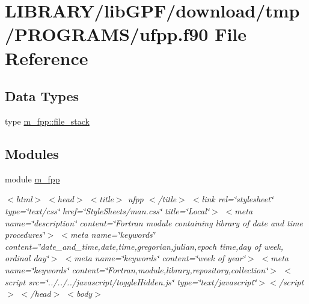 \hypertarget{ufpp_8f90}{}\section{L\+I\+B\+R\+A\+R\+Y/lib\+G\+P\+F/download/tmp/\+P\+R\+O\+G\+R\+A\+M\+S/ufpp.f90 File Reference}
\label{ufpp_8f90}
\subsection*{Data Types}
\begin{DoxyCompactItemize}
\item 
type \hyperlink{structm__fpp_1_1file__stack}{m\+\_\+fpp\+::file\+\_\+stack}
\end{DoxyCompactItemize}
\subsection*{Modules}
\begin{DoxyCompactItemize}
\item 
module \hyperlink{namespacem__fpp}{m\+\_\+fpp}
\begin{DoxyCompactList}\small\item\em $<$html$>$ $<$head$>$ $<$title$>$ ufpp $<$/title$>$ $<$link rel=\char`\"{}stylesheet\char`\"{} type=\char`\"{}text/css\char`\"{} href=\char`\"{}\+Style\+Sheets/man.\+css\char`\"{} title=\char`\"{}\+Local\char`\"{}$>$ $<$meta name=\char`\"{}description\char`\"{} content=\char`\"{}\+Fortran module containing library of date and time procedures\char`\"{}$>$ $<$meta name=\char`\"{}keywords\char`\"{} content=\char`\"{}date\+\_\+and\+\_\+time,date,time,gregorian,julian,epoch time,day of week, ordinal day\char`\"{}$>$ $<$meta name=\char`\"{}keywords\char`\"{} content=\char`\"{}week of year\char`\"{}$>$ $<$meta name=\char`\"{}keywords\char`\"{} content=\char`\"{}\+Fortran,module,library,repository,collection\char`\"{}$>$ $<$script src=\char`\"{}../../../javascript/toggle\+Hidden.\+js\char`\"{} type=\char`\"{}text/javascript\char`\"{}$>$$<$/script$>$ $<$/head$>$ $<$body$>$

\href{../../../GPF.html}{\tt }\end{DoxyCompactList}\end{DoxyCompactItemize}

